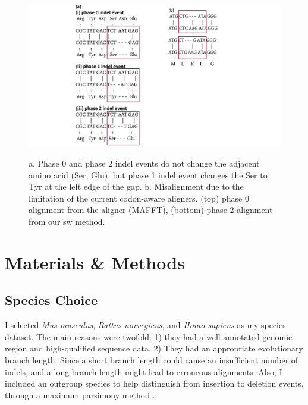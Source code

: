\begin{figure}[H]
     \centering
     \begin{minipage}[t]{1\textwidth }
     \includegraphics[width=\linewidth]{Fig1.pdf}
     { {a. Phase 0 and phase 2 indel events do not change the adjacent amino acid (Ser, Glu), but phase 1 indel event changes the Ser to Tyr at the left edge of the gap. b. Misalignment due to the limitation of the current codon-aware aligners. (top) phase 0 alignment from the aligner (MAFFT), (bottom) phase 2 alignment from our sw method.}
 \par}
     \end{minipage}
\end{figure}

\section{Materials \& Methods}
\subsection{Species Choice}
I selected \emph{Mus musculus}, \emph{Rattus norvegicus}, and \emph{Homo sapiens} as my species dataset. The main reasons were twofold: 1) they had a well-annotated genomic region and high-qualified sequence data. 2) They had an appropriate evolutionary branch length. Since a short branch length could cause an insufficient number of indels, and a long branch length might lead to erroneous alignments. Also, I included an outgroup species to help distinguish from insertion to deletion events, through a maximum parsimony method \parencite{saitou1989relative}. 

